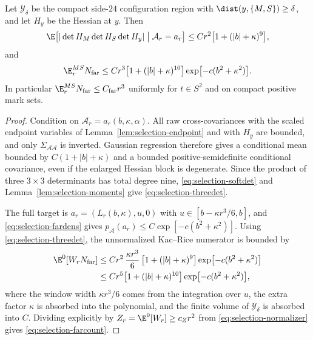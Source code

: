 \begin{lemma}\label{lem:selection-far}
Let $\mathcal Y_\delta$ be the compact side-$24$ configuration region with $\dist(y,\{M,S\})\ge\delta$, and let $H_y$ be the Hessian at $y$. Then
\begin{equation}\label{eq:selection-threedet}
\E\bigl[|\det H_M\det H_S\det H_y|\bigm|\mathcal A_r=a_r\bigr]\le Cr^2\bigl[1+(|b|+\kappa)^9\bigr],
\end{equation}
and
\begin{equation}\label{eq:selection-farcount}
\E^{MS}_rN_{\rm far}\le Cr^3\bigl[1+(|b|+\kappa)^{10}\bigr]\exp\bigl[-c(b^2+\kappa^2)\bigr].
\end{equation}
In particular $\E^{MS}_rN_{\rm far}\le C_{\rm far}r^3$ uniformly for $t\in S^2$ and on compact positive mark sets.
\end{lemma}

\begin{proof}
Condition on $\mathcal A_r=a_r(b,\kappa,\alpha)$. All raw cross-covariances with the scaled endpoint variables of Lemma~\ref{lem:selection-endpoint} and with $H_y$ are bounded, and only $\Sigma_{\mathcal A\mathcal A}$ is inverted. Gaussian regression therefore gives a conditional mean bounded by $C(1+|b|+\kappa)$ and a bounded positive-semidefinite conditional covariance, even if the enlarged Hessian block is degenerate. Since the product of three $3\times3$ determinants has total degree nine, \eqref{eq:selection-softdet} and Lemma~\ref{lem:selection-moments} give \eqref{eq:selection-threedet}.

The full target is $a_r=(L_r(b,\kappa),u,0)$ with $u\in[b-\kappa r^3/6,b]$, and \eqref{eq:selection-fardens} gives $p_{\mathcal A}(a_r)\le C\exp[-c(b^2+\kappa^2)]$. Using \eqref{eq:selection-threedet}, the unnormalized Kac--Rice numerator is bounded by
\begin{equation}\label{eq:selection-farnum}
\begin{aligned}
\E^0[W_rN_{\rm far}]&\le Cr^2\,\frac{\kappa r^3}6\,\bigl[1+(|b|+\kappa)^9\bigr]\exp\bigl[-c(b^2+\kappa^2)\bigr]\\
&\le Cr^5\bigl[1+(|b|+\kappa)^{10}\bigr]\exp\bigl[-c(b^2+\kappa^2)\bigr],
\end{aligned}
\end{equation}
where the window width $\kappa r^3/6$ comes from the integration over $u$, the extra factor $\kappa$ is absorbed into the polynomial, and the finite volume of $\mathcal Y_\delta$ is absorbed into $C$. Dividing explicitly by $Z_r=\E^0[W_r]\ge c_Zr^2$ from \eqref{eq:selection-normalizer} gives \eqref{eq:selection-farcount}.
\end{proof}

